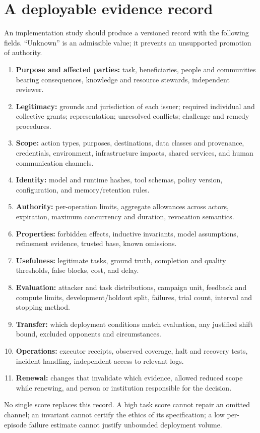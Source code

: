 \documentclass[10pt,twocolumn,letterpaper]{article}
\begin{document}
\section{A deployable evidence record}
\label{app:record}
An implementation study should produce a versioned record with the following fields. ``Unknown'' is an admissible value; it prevents an unsupported promotion of authority.

\begin{enumerate}
\item \textbf{Purpose and affected parties:} task, beneficiaries, people and communities bearing consequences, knowledge and resource stewards, independent reviewer.
\item \textbf{Legitimacy:} grounds and jurisdiction of each issuer; required individual and collective grants; representation; unresolved conflicts; challenge and remedy procedures.
\item \textbf{Scope:} action types, purposes, destinations, data classes and provenance, credentials, environment, infrastructure impacts, shared services, and human communication channels.
\item \textbf{Identity:} model and runtime hashes, tool schemas, policy version, configuration, and memory/retention rules.
\item \textbf{Authority:} per-operation limits, aggregate allowances across actors, expiration, maximum concurrency and duration, revocation semantics.
\item \textbf{Properties:} forbidden effects, inductive invariants, model assumptions, refinement evidence, trusted base, known omissions.
\item \textbf{Usefulness:} legitimate tasks, ground truth, completion and quality thresholds, false blocks, cost, and delay.
\item \textbf{Evaluation:} attacker and task distributions, campaign unit, feedback and compute limits, development/holdout split, failures, trial count, interval and stopping method.
\item \textbf{Transfer:} which deployment conditions match evaluation, any justified shift bound, excluded opponents and circumstances.
\item \textbf{Operations:} executor receipts, observed coverage, halt and recovery tests, incident handling, independent access to relevant logs.
\item \textbf{Renewal:} changes that invalidate which evidence, allowed reduced scope while renewing, and person or institution responsible for the decision.
\end{enumerate}
No single score replaces this record. A high task score cannot repair an omitted channel; an invariant cannot certify the ethics of its specification; a low per-episode failure estimate cannot justify unbounded deployment volume.
\end{document}
